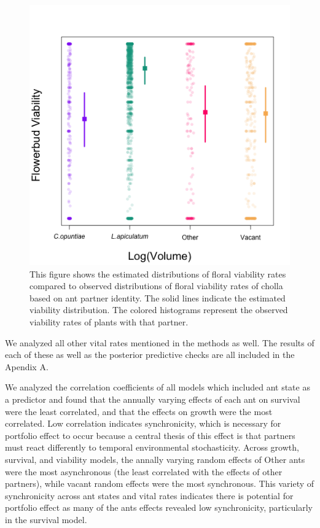 \documentclass[11pt]{article}
\begin{document}
\begin{figure}[H]
	\includegraphics[width=0.95\linewidth]{Figures/viab.png}
	\caption{This figure shows the estimated distributions of floral viability rates compared to observed distributions of floral viability rates of cholla based on ant partner identity. The solid lines indicate the estimated viability distribution. The colored histograms represent the observed viability rates of plants with that partner. }
	\label{fig:Viab}
\end{figure}

We analyzed all other vital rates mentioned in the methods as well.
The results of each of these as well as the posterior predictive checks are all included in the Apendix A.

We analyzed the correlation coefficients of all models which included ant state as a predictor and found that the annually varying effects of each ant on survival were the least correlated, and that the effects on growth were the most correlated. 
Low correlation indicates synchronicity, which is necessary for portfolio effect to occur because a central thesis of this effect is that partners must react differently to temporal environmental stochasticity.
Across growth, survival, and viability models, the annally varying random effects of Other ants were the most asynchronous (the least correlated with the effects of other partners), while vacant random effects were the most synchronous. 
This variety of synchronicity across ant states and vital rates indicates there is potential for portfolio effect as many of the ants effects revealed low synchronicity, particularly in the survival model. 
\end{document}
